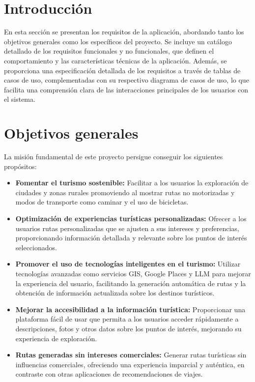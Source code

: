 
\section{Introducción}
En esta sección se presentan los requisitos de la aplicación, abordando tanto los objetivos generales como los específicos del proyecto. Se incluye un catálogo detallado de los requisitos funcionales y no funcionales, que definen el comportamiento y las características técnicas de la aplicación. Además, se proporciona una especificación detallada de los requisitos a través de tablas de casos de uso, complementadas con su respectivo diagrama de casos de uso, lo que facilita una comprensión clara de las interacciones principales de los usuarios con el sistema.


\section{Objetivos generales}
La misión fundamental de este proyecto persigue conseguir los siguientes propósitos:
\begin{itemize}
	\item \textbf{Fomentar el turismo sostenible:} Facilitar a los usuarios la exploración de ciudades y zonas rurales promoviendo al mostrar rutas no motorizadas y modos de transporte como caminar y el uso de bicicletas.
	
	\item \textbf{Optimización de experiencias turísticas personalizadas:} Ofrecer a los usuarios rutas personalizadas que se ajusten a sus intereses y preferencias, proporcionando información detallada y relevante sobre los puntos de interés seleccionados.
	
	\item \textbf{Promover el uso de tecnologías inteligentes en el turismo:} Utilizar tecnologías avanzadas como servicios GIS, Google Places y LLM para mejorar la experiencia del usuario, facilitando la generación automática de rutas y la obtención de información actualizada sobre los destinos turísticos.
	
	\item \textbf{Mejorar la accesibilidad a la información turística:} Proporcionar una plataforma fácil de usar que permita a los usuarios acceder rápidamente a descripciones, fotos y otros datos sobre los puntos de interés, mejorando su experiencia de exploración.
	
	\item \textbf{Rutas generadas sin intereses comerciales:} Generar rutas turísticas sin influencias comerciales, ofreciendo una experiencia imparcial y auténtica, en contraste con otras aplicaciones de recomendaciones de viajes.
\end{itemize}

